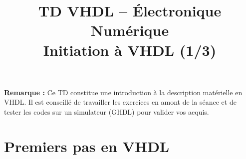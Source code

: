\documentclass[a4paper,11pt]{article}
\title{\textcolor{primary}{\Huge\bfseries TD VHDL -- Électronique Numérique}\\[0.5em] \Large Initiation à VHDL (1/3)}
\author{}
\date{}
\begin{document}
\maketitle
\vspace{-2em}

\begin{notebox}
\textbf{Remarque :} Ce TD constitue une introduction à la description matérielle en VHDL. Il est conseillé de travailler les exercices en amont de la séance et de tester les codes sur un simulateur (GHDL) pour valider vos acquis.
\end{notebox}

\vspace{1em}

\section{Premiers pas en VHDL}
\end{document}
